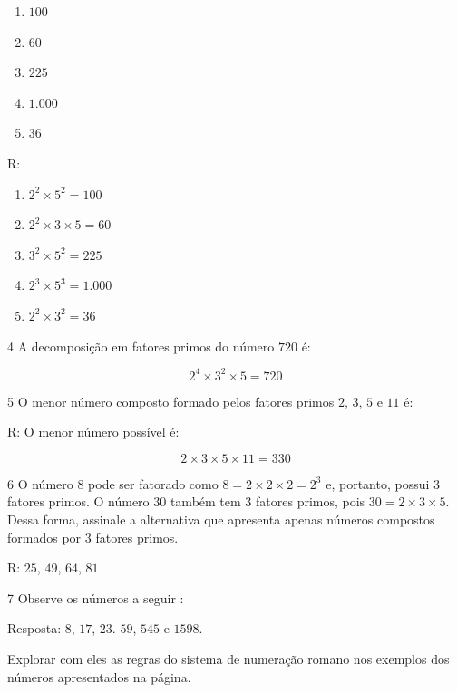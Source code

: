 \begin{enumerate}
\item  $100$

\item  $60$

\item  $225$

\item  $1.000$

\item  $36$
\end{enumerate}

R:

\begin{enumerate}
\item $2^2\times 5^2 = 100$

\item $2^2\times 3\times 5 = 60$

\item $3^2\times 5^2 = 225$

\item $2^3\times 5^3 = 1.000$

\item $2^2\times 3^2 = 36$
\end{enumerate}

\num{4}  A decomposição em fatores primos do número $720$ é:

$$2^4\times 3^2\times 5 = 720$$

\num{5}  O menor número composto formado pelos fatores primos $2$, $3$, $5$ e $11$ é:

R: O menor número possível é:

$$2\times 3\times 5\times 11 = 330$$

\num{6}  O número $8$ pode ser fatorado como $8 = 2\times 2\times 2 = 2^3$ e, portanto,
possui $3$ fatores primos. O número $30$ também tem $3$ fatores primos, pois
$30 = 2\times 3\times 5$. Dessa forma, assinale a alternativa que apresenta apenas
números compostos formados por $3$ fatores primos.

R: $25$, $49$, $64$, $81$

\num{7}  Observe os números a seguir :


Resposta: $8$, $17$, $23$. $59$, $545$ e $1598$.

Explorar com eles as regras do sistema de numeração romano nos exemplos
dos números apresentados na página.

